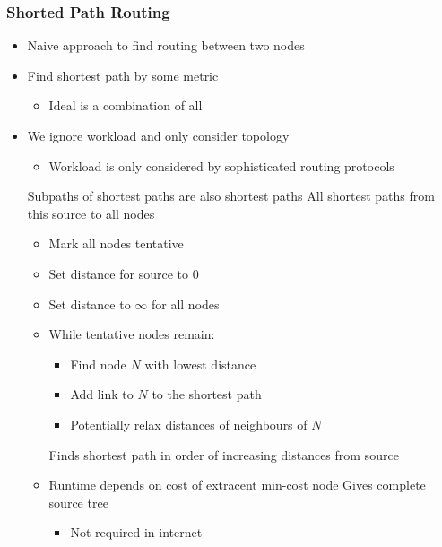 \subsubsection{Shorted Path Routing}
\begin{itemize}
    \item Naive approach to find routing between two nodes
    \item Find shortest path by some metric
        \begin{itemize}
             Avoid circuitous paths
             Avoid small pipes
             Avoid expensive links
             To reduce switching
            \item Ideal is a combination of all
        \end{itemize}
    \item We ignore workload and only consider topology
        \begin{itemize}
            \item Workload is only considered by sophisticated routing protocols
        \end{itemize}
     Subpaths of shortest paths are also shortest paths
     All shortest paths from this source to all nodes
        \begin{itemize}
            \item Mark all nodes tentative
            \item Set distance for source to $0$
            \item Set distance to $\infty$ for all nodes
            \item While tentative nodes remain:
                \begin{itemize}
                    \item Find node $N$ with lowest distance
                    \item Add link to $N$ to the shortest path
                    \item Potentially relax distances of neighbours of $N$
                \end{itemize}
            \ipro Finds shortest path in order of increasing distances from source
            \item Runtime depends on cost of extracent min-cost node
            \icon Gives complete source tree
                \begin{itemize}
                    \item Not required in internet

\end{itemize}
\end{itemize}
\end{itemize}
